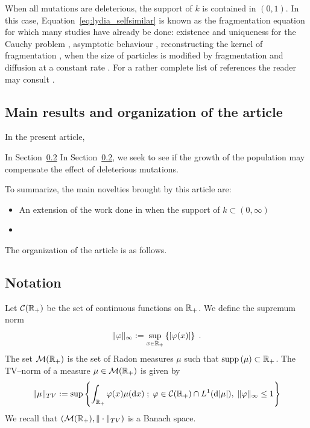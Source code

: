 \documentclass[11pt]{amsart}
\newcommand{\dd}{\mathrm{d}}
\newcommand{\supp}{\mathrm{supp}\,}
\begin{document}
When all mutations are deleterious, the support of $k$ is contained in $(0,1)$. In this case, Equation~\eqref{eq:lydia_selfsimilar} is known as the fragmentation equation for which many studies have already be done: existence and uniqueness for the Cauchy problem \cite{melzak1957scalar}, asymptotic behaviour \cite{doumic2016time}, reconstructing the kernel of fragmentation \cite{hoang2017estimating,hoang2017nonparametric, doumic2018estimating,doumic2021inverse}, when the size of particles is modified by fragmentation and diffusion at a constant rate \cite{laurenccot2022fragmentation}. 
For a rather complete list of references the reader may consult \cite{banasiak2019analytic,bertoin2006random}.
    

\subsection{Main results and organization of the article} \mbox{}

In the present article, 

In Section~\ref{}
In Section~\ref{}, we seek to see if the growth of the population may compensate the effect of deleterious mutations. 

To summarize, the main novelties brought by this article are: 
\begin{itemize}
    \item An extension of the work done in \cite{doumic2016time} when the support of $k \subset (0, \infty)$
    \item 
\end{itemize}

The organization of the article is as follows.

\subsection{Notation} \mbox{}

Let $\mathcal{C}(\mathbb{R}_+)$ be the set of continuous functions on $\mathbb{R}_+$. We define the supremum norm
\begin{equation*}
    \|\varphi\|_{\infty} :=\sup_{x \in \mathbb{R}_+} \left\{ |\varphi(x)| \right\}
    \; .
\end{equation*}
The set $\mathcal{M}(\mathbb{R}_+)$ is the set of Radon measures $\mu$ such that $\supp(\mu) \subset \RR_+$. The TV--norm of a measure $\mu \in \mathcal{M}(\mathbb{R}_+)$ is given by 
    \begin{equation*}
        \|\mu\|_{TV} :=\sup \left\{ \int_{\RR_+} \varphi(x) \mu(\dd x)\; ; \; \varphi \in \Ccal(\RR_+)\cap L^1(\dd|\mu|),\; \|\varphi\|_{\infty} \leq 1\right\}
    \end{equation*}
We recall that $\left(\mathcal{M}(\mathbb{R}_+), \|\cdot\|_{TV}\right)$ is a Banach space. 
\end{document}
